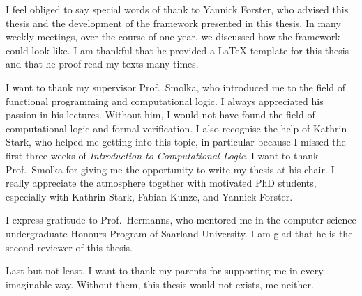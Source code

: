 I feel obliged to say special words of thank to Yannick Forster, who advised this thesis and the development of the framework presented in this
thesis.  In many weekly meetings, over the course of one year, we discussed how the framework could look like.  I am thankful that he provided a
{\LaTeX} template for this thesis and that he proof read my texts many times.

I want to thank my supervisor Prof.~Smolka, who introduced me to the field of functional programming and computational logic.  I always appreciated
his passion in his lectures.  Without him, I would not have found the field of computational logic and formal verification.  I also recognise the help
of Kathrin Stark, who helped me getting into this topic, in particular because I missed the first three weeks of \textit{Introduction to Computational
  Logic}.  I want to thank Prof.~Smolka for giving me the opportunity to write my thesis at his chair.  I really appreciate the atmosphere together
with motivated PhD students, especially with Kathrin Stark, Fabian Kunze, and Yannick Forster.

I express gratitude to Prof.~Hermanns, who mentored me in the computer science undergraduate Honours Program of Saarland University.  I am glad that
he is the second reviewer of this thesis.

Last but not least, I want to thank my parents for supporting me in every imaginable way.  Without them, this thesis would not exists, me neither.


